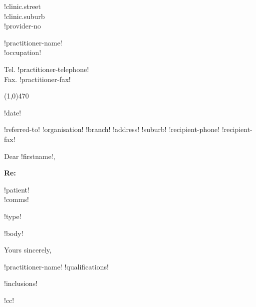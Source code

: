 \documentclass{article}
\begin{document}
\linethickness{0.4mm}

\noindent
\parbox[t]{53mm}{!clinic.street \\ !clinic.suburb \\ !provider-no} \parbox[t]{54mm}{\centering !practitioner-name!\\ \vspace{1.5mm} {\Large !occupation!}}  
\parbox[t]{53mm}{\raggedleft Tel. !practitioner-telephone! \\ Fax. !practitioner-fax!}
\vspace{-0.70cm}

\noindent
\begin{center}
\line(1,0){470}
\end{center}

\begin{flushright} 
!date!
\end{flushright}

\noindent 
{\raggedright
!referred-to! !organisation! !branch! !address!
!suburb! !recipient-phone! !recipient-fax!
 }

\vspace{6mm}

\noindent
Dear !firstname!,

\vspace{1mm}

\noindent
\parbox[t]{10mm}{\textbf{Re:}} \parbox[t]{140mm}{!patient! \\ !comms!}
\vspace{-3mm}

!type!

\noindent !body!

\vspace{6mm}

\begin{samepage}
Yours sincerely,

\vspace{1.4cm}

!practitioner-name! !qualifications!

!inclusions!

!cc!
\end{samepage}
\end{document}
